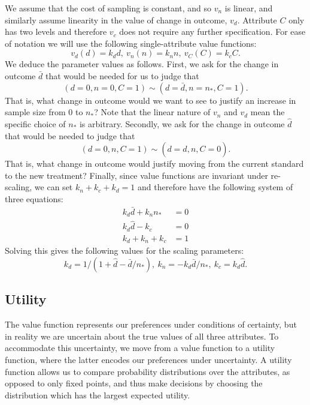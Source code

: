\documentclass[sagev, Crown]{sagej}
\begin{document}
We assume that the cost of sampling is constant, and so $v_n$ is linear, and similarly assume linearity in the value of change in outcome, $v_d$. Attribute $C$ only has two levels and therefore $v_c$ does not require any further specification. For ease of notation we will use the following single-attribute value functions:
$$ 
v_d(d) = k_d d, ~ v_n(n) = k_n n, ~ v_C(C) = k_c C.
$$
We deduce the parameter values as follows. First, we ask for the change in outcome $\bar{d}$ that would be needed for us to judge that
$$
(d = 0, n = 0, C = 1) \sim (d = \bar{d}, n = n_*, C = 1).
$$
That is, what change in outcome would we want to see to justify an increase in sample size from 0 to $n_*$? Note that the linear nature of $v_n$ and $v_d$ mean the specific choice of $n_*$ is arbitrary. Secondly, we ask for the change in outcome $\hat{d}$ that would be needed to judge that
$$
(d = 0, n, C = 1) \sim (d = \hat{d}, n, C = 0).
$$
That is, what change in outcome would justify moving from the current standard to the new treatment? Finally, since value functions are invariant under re-scaling, we can set $k_n + k_c + k_d = 1$ and therefore have the following system of three equations:
\begin{align*}
k_d \bar{d} + k_n n_* &= 0 \\
k_d \hat{d} - k_c &= 0 \\
k_d + k_n + k_c &= 1
\end{align*}
Solving this gives the following values for the scaling parameters:
\begin{equation}\label{eqn:ks}
k_d = 1/(1 + \hat{d} - \bar{d}/n_*), ~ k_n = -k_d \bar{d}/n_* , ~ k_c = k_d \hat{d}. 
\end{equation}



\subsection{Utility}

The value function represents our preferences under conditions of certainty, but in reality we are uncertain about the true values of all three attributes. To accommodate this uncertainty, we move from a value function to a utility function, where the latter encodes our preferences under uncertainty. A utility function allows us to compare probability distributions over the attributes, as opposed to only fixed points, and thus make decisions by choosing the distribution which has the largest expected utility.
\end{document}
